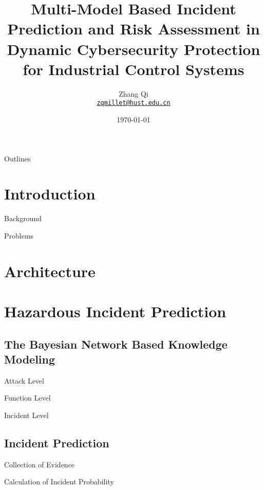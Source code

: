 \documentclass[10pt, compress]{beamer}
\title{Multi-Model Based Incident Prediction and Risk Assessment in Dynamic Cybersecurity Protection for Industrial Control Systems}
\subtitle{}
\date{\today}
\author[Zhang Qi] %
{
  Zhang Qi\\
  \href{mailto:qiqi@hust.edu.cn}{{\tt zqmillet@hust.edu.cn}}
}
\institute{Automation School\\Huazhong University of Science and Technology\\Wuhan}
\begin{document}
\maketitle

\begin{frame}[noframenumbering]{Outlines}
    \tableofcontents %
\end{frame}

\section{Introduction}
\begin{frame}{Background}
\end{frame}

\begin{frame}{Problems}
\end{frame}

\section{Architecture}

\section{Hazardous Incident Prediction}
\subsection{The Bayesian Network Based Knowledge Modeling}
\begin{frame}{Attack Level}
\end{frame}

\begin{frame}{Function Level}
\end{frame}

\begin{frame}{Incident Level}
\end{frame}

\subsection{Incident Prediction}
\begin{frame}{Collection of Evidence}
\end{frame}

\begin{frame}{Calculation of Incident Probability}
\end{frame}
\end{document}
